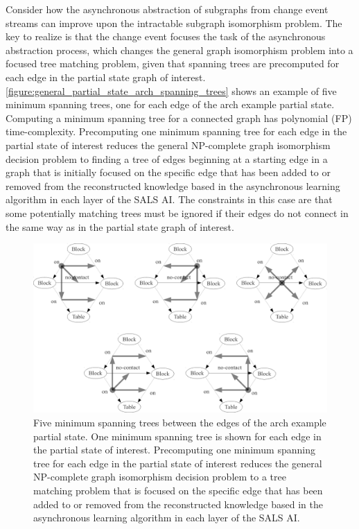 Consider how the asynchronous abstraction of subgraphs from change
event streams can improve upon the intractable subgraph isomorphism
problem.  The key to realize is that the change event focuses the task
of the asynchronous abstraction process, which changes the general
graph isomorphism problem into a focused tree matching problem, given
that spanning trees are precomputed for each edge in the partial state
graph of interest.
{\mbox{\autoref{figure:general_partial_state_arch_spanning_trees}}}
shows an example of five minimum spanning trees, one for each edge of
the arch example partial state.  Computing a minimum spanning tree for
a connected graph has polynomial (FP) time-complexity.  Precomputing
one minimum spanning tree for each edge in the partial state of
interest reduces the general NP-complete graph isomorphism decision
problem to finding a tree of edges beginning at a starting edge in a
graph that is initially focused on the specific edge that has been
added to or removed from the reconstructed knowledge based in the
asynchronous learning algorithm in each layer of the SALS AI.  The
constraints in this case are that some potentially matching trees must
be ignored if their edges do not connect in the same way as in the
partial state graph of interest.
\begin{figure}
\centering
\includegraphics[width=12cm]{gfx/general_partial_state_arch_spanning_trees}
\caption[Five minimum spanning trees between the edges of the arch
  example partial state.]{Five minimum spanning trees between the
  edges of the arch example partial state.  One minimum spanning tree
  is shown for each edge in the partial state of interest.
  Precomputing one minimum spanning tree for each edge in the partial
  state of interest reduces the general NP-complete graph isomorphism
  decision problem to a tree matching problem that is focused on the
  specific edge that has been added to or removed from the
  reconstructed knowledge based in the asynchronous learning algorithm
  in each layer of the SALS AI.}
\label{figure:general_partial_state_arch_spanning_trees}
\end{figure}


